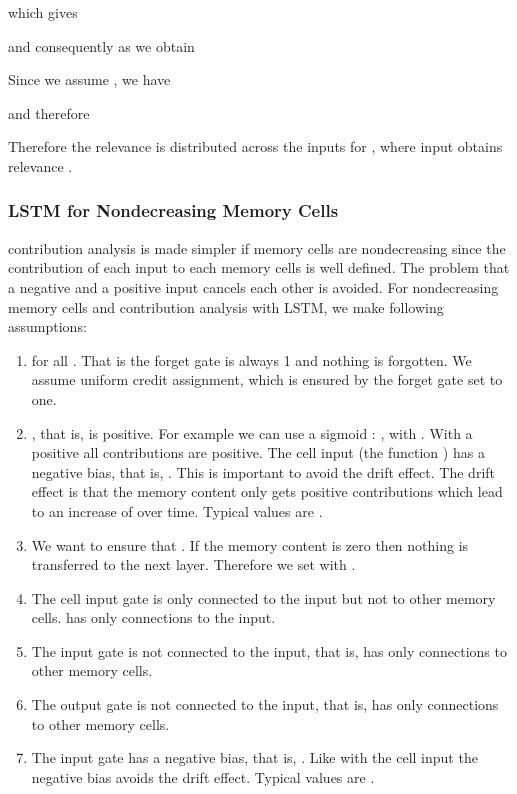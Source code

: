 \documentclass{article}
\begin{document}
\begin{appendices}
which gives

and consequently as  we obtain

Since we assume , we have

and therefore


Therefore the relevance  is distributed across the inputs
 for , where input  obtains relevance .


\subsubsection{LSTM for Nondecreasing Memory Cells}

contribution analysis is made simpler if memory cells are nondecreasing since
the contribution of each input to each memory cells
is well defined. The problem that a 
negative and a positive input cancels each other is avoided. 
For nondecreasing memory cells 
and contribution analysis with LSTM, 
we make following assumptions:
\begin{enumerate}[label=\textbf{(A\arabic*)}]
\item  for all . That is the forget gate is always 1 and
  nothing is forgotten. We assume uniform credit assignment, which
  is ensured by the forget gate set to one.

\item , that is,  is positive. For example we can use a sigmoid
  : , with
  .
  With a positive  all
  contributions are positive.
  The cell input  (the function ) has a negative bias, that is,
  . This is important to avoid the drift effect.
  The drift effect is that the memory content only gets positive
  contributions which lead to an increase of  over time.
  Typical values are .

\item We want to ensure that . If the memory content is zero
  then nothing is transferred to the next layer.
  Therefore we set  with .

\item The cell input gate  is only connected to the input but not
  to other memory cells.   has only connections to the
  input. 

\item The input gate  is not connected to the input, that is,
   has only connections to other memory cells. 

\item The output gate  is not connected to the input, that is,
   has only connections to other memory cells. 

\item The input gate  has a negative bias, that is,
  . Like with the cell input the negative bias
  avoids the drift effect.
  Typical values are .


\end{enumerate}
\end{appendices}
\end{document}
